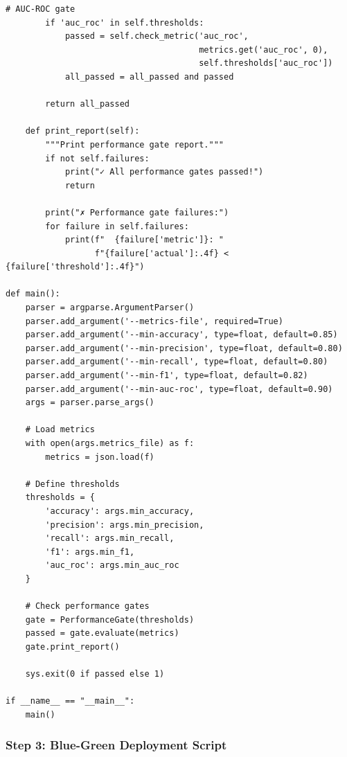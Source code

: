 \begin{lstlisting}[style=python, caption=scripts/check_performance_gates.py]
        # AUC-ROC gate
        if 'auc_roc' in self.thresholds:
            passed = self.check_metric('auc_roc',
                                       metrics.get('auc_roc', 0),
                                       self.thresholds['auc_roc'])
            all_passed = all_passed and passed

        return all_passed

    def print_report(self):
        """Print performance gate report."""
        if not self.failures:
            print("✓ All performance gates passed!")
            return

        print("✗ Performance gate failures:")
        for failure in self.failures:
            print(f"  {failure['metric']}: "
                  f"{failure['actual']:.4f} < {failure['threshold']:.4f}")

def main():
    parser = argparse.ArgumentParser()
    parser.add_argument('--metrics-file', required=True)
    parser.add_argument('--min-accuracy', type=float, default=0.85)
    parser.add_argument('--min-precision', type=float, default=0.80)
    parser.add_argument('--min-recall', type=float, default=0.80)
    parser.add_argument('--min-f1', type=float, default=0.82)
    parser.add_argument('--min-auc-roc', type=float, default=0.90)
    args = parser.parse_args()

    # Load metrics
    with open(args.metrics_file) as f:
        metrics = json.load(f)

    # Define thresholds
    thresholds = {
        'accuracy': args.min_accuracy,
        'precision': args.min_precision,
        'recall': args.min_recall,
        'f1': args.min_f1,
        'auc_roc': args.min_auc_roc
    }

    # Check performance gates
    gate = PerformanceGate(thresholds)
    passed = gate.evaluate(metrics)
    gate.print_report()

    sys.exit(0 if passed else 1)

if __name__ == "__main__":
    main()
\end{lstlisting}

\subsubsection*{Step 3: Blue-Green Deployment Script}

